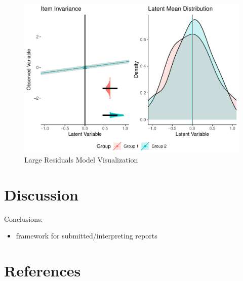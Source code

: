 \documentclass[
  man]{apa6}
\providecommand{\tightlist}{%
  \setlength{\itemsep}{0pt}\setlength{\parskip}{0pt}}
\begin{document}
\begin{figure}
\centering
\includegraphics{manuscript_files/figure-latex/large-res-pic-1.pdf}
\caption{\label{fig:large-res-pic}Large Residuals Model Visualization}
\end{figure}

\hypertarget{discussion}{%
\section{Discussion}\label{discussion}}

Conclusions:

\begin{itemize}
\tightlist
\item
  framework for submitted/interpreting reports
\end{itemize}

\newpage

\hypertarget{references}{%
\section{References}\label{references}}
\end{document}
